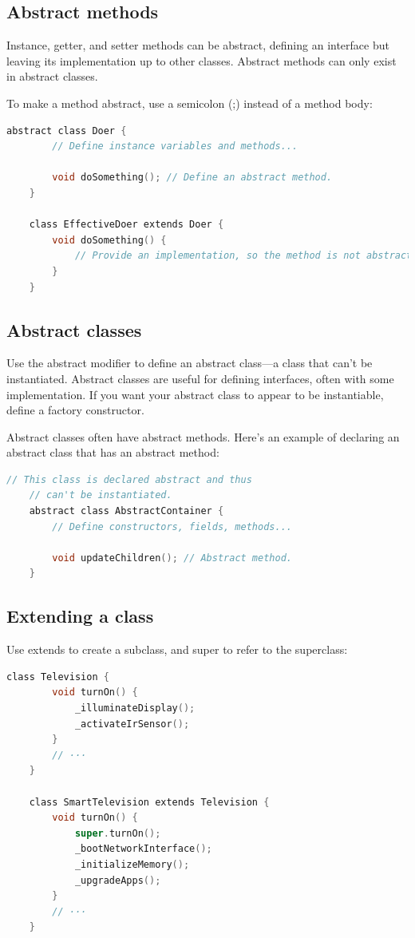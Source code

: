 \subsection{Abstract methods}
Instance, getter, and setter methods can be abstract, defining an interface but leaving its implementation up to other classes. Abstract methods can only exist in abstract classes.

To make a method abstract, use a semicolon (;) instead of a method body:

\begin{lstlisting}[language=C]
	abstract class Doer {
		// Define instance variables and methods...
		
		void doSomething(); // Define an abstract method.
	}
	
	class EffectiveDoer extends Doer {
		void doSomething() {
			// Provide an implementation, so the method is not abstract here...
		}
	}
\end{lstlisting}
\subsection{Abstract classes}
Use the abstract modifier to define an abstract class—a class that can't be instantiated. Abstract classes are useful for defining interfaces, often with some implementation. If you want your abstract class to appear to be instantiable, define a factory constructor.

Abstract classes often have abstract methods. Here's an example of declaring an abstract class that has an abstract method:
\begin{lstlisting}[language=C]
	// This class is declared abstract and thus
	// can't be instantiated.
	abstract class AbstractContainer {
		// Define constructors, fields, methods...
		
		void updateChildren(); // Abstract method.
	}
\end{lstlisting}
\subsection{Extending a class}
Use extends to create a subclass, and super to refer to the superclass:
\begin{lstlisting}[language=C]
	class Television {
		void turnOn() {
			_illuminateDisplay();
			_activateIrSensor();
		}
		// ···
	}
	
	class SmartTelevision extends Television {
		void turnOn() {
			super.turnOn();
			_bootNetworkInterface();
			_initializeMemory();
			_upgradeApps();
		}
		// ···
	}
	
\end{lstlisting}
